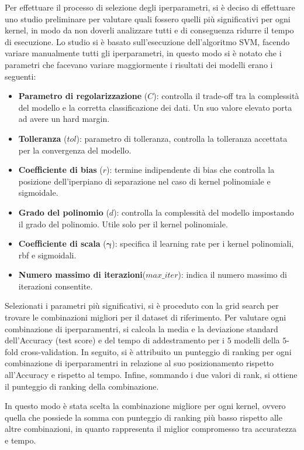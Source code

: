 Per effettuare il processo di selezione degli iperparametri, si è deciso di
effettuare uno studio preliminare per valutare quali fossero quelli più
significativi per ogni kernel, in modo da non doverli analizzare tutti e di
conseguenza ridurre il tempo di esecuzione. Lo studio si è basato sull'esecuzione
dell'algoritmo SVM, facendo variare manualmente tutti gli iperparametri, in questo
modo si è notato che i parametri che facevano variare maggiormente i risultati
dei modelli erano i seguenti:
\begin{itemize}
    \item \textbf{Parametro di regolarizzazione} ($C$): controlla il trade-off tra
          la complessità del modello e la corretta classificazione dei dati.
          Un suo valore elevato porta ad avere un hard margin.
    \item \textbf{Tolleranza} ($tol$): parametro di tolleranza, controlla la
          tolleranza accettata per la convergenza del modello.
    \item \textbf{Coefficiente di bias} ($r$): termine indipendente di bias che
          controlla la posizione dell'iperpiano di separazione nel caso di
          kernel polinomiale e sigmoidale.
    \item \textbf{Grado del polinomio} ($d$): controlla la complessità del modello
          impostando il grado del polinomio. Utile solo per il kernel polinomiale.
    \item \textbf{Coefficiente di scala} ($\boldsymbol{\gamma}$): specifica il learning
          rate per i kernel polinomiali, rbf e sigmoidali.
    \item \textbf{Numero massimo di iterazioni}($max\_iter$): indica il numero massimo
          di iterazioni consentite.
\end{itemize}

Selezionati i parametri più significativi, si è proceduto con la grid search
per trovare le combinazioni migliori per il dataset di riferimento. Per valutare
ogni combinazione di iperparamentri, si calcola la media e la deviazione standard
dell'Accuracy (test score) e del tempo di addestramento per i $5$ modelli della $5$-fold
cross-validation.
In seguito, si è attribuito un punteggio di ranking per ogni combinazione
di iperparamentri in relazione al suo posizionamento rispetto all'Accuracy e rispetto
al tempo. Infine, sommando i due valori di rank, si ottiene il punteggio di ranking
della combinazione.

In questo modo è stata scelta la combinazione migliore per ogni kernel, ovvero quella che possiede la somma
con punteggio di ranking più basso rispetto alle altre combinazioni, in quanto rappresenta
il miglior compromesso tra accuratezza e tempo.

